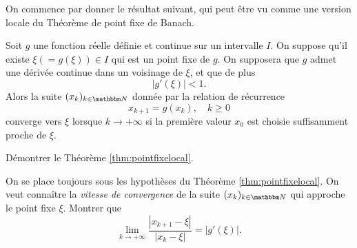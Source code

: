 On commence par donner le résultat suivant, qui peut être vu comme une version locale du Théorème de point fixe de Banach.

\begin{theorem}
\label{thm:pointfixelocal}
Soit $g$ une fonction réelle définie et continue sur un intervalle $I$. On suppose qu'il existe 
$\xi (= g(\xi)) \in I$ qui est un point fixe de $g$. On supposera que $g$ admet une dérivée continue dans un voisinage de $\xi$, et que de plus
\[
| g'(\xi) | < 1.
\]
Alors la suite $(x_k)_{k\in\eN}$ donnée par la relation de récurrence 
$$x_{k+1} = g(x_k),\quad k\geq0$$ 
converge vers $\xi$ lorsque $k\rightarrow +\infty$ si la première valeur $x_0$ est choisie suffisamment proche de $\xi$.
\end{theorem}


\bigskip

\begin{exercice}

Démontrer le Théorème \ref{thm:pointfixelocal}.

\end{exercice}

\medskip

\begin{exercice}

On se place toujours sous les hypothèses du Théorème \ref{thm:pointfixelocal}. On veut connaître la \emph{vitesse de convergence} de la suite $(x_k)_{k\in\eN}$ qui approche le point fixe $\xi$. Montrer que
\[
\lim_{k\rightarrow +\infty} \frac{|x_{k+1} - \xi|}{| x_k - \xi |} = |g'(\xi)|.
\]

\end{exercice}

\medskip

